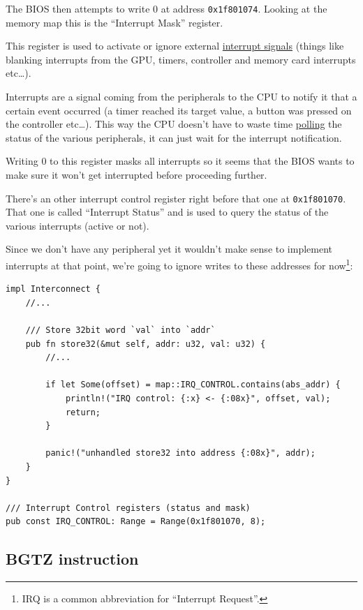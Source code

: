 \documentclass[a4paper]{article}
\newcommand{\code}[1] {\texttt{#1}}
\begin{document}
The BIOS then attempts to write 0 at address
\code{0x1f801074}. Looking at the memory map this is the ``Interrupt
Mask'' register.

This register is used to activate or ignore external
\href{https://en.wikipedia.org/wiki/Interrupt}{interrupt signals}
(things like blanking interrupts from the GPU, timers, controller and
memory card interrupts etc\dots{}).

Interrupts are a signal coming from the peripherals to the CPU to
notify it that a certain event occurred (a timer reached its target
value, a button was pressed on the controller etc\dots{}). This way
the CPU doesn't have to waste time
\href{https://en.wikipedia.org/wiki/Polling_%28computer_science%29}{polling}
  the status of the various peripherals, it can just wait for the
  interrupt notification.

Writing 0 to this register masks all interrupts so it seems that the
BIOS wants to make sure it won't get interrupted before proceeding
further.

There's an other interrupt control register right before that one at
\code{0x1f801070}. That one is called ``Interrupt Status'' and is used
to query the status of the various interrupts (active or not).

Since we don't have any peripheral yet it wouldn't make sense to
implement interrupts at that point, we're going to ignore writes to
these addresses for now\footnote{IRQ is a common abbreviation for
  ``Interrupt Request''.}:

\begin{lstlisting}
impl Interconnect {
    //...

    /// Store 32bit word `val` into `addr`
    pub fn store32(&mut self, addr: u32, val: u32) {
        //...

        if let Some(offset) = map::IRQ_CONTROL.contains(abs_addr) {
            println!("IRQ control: {:x} <- {:08x}", offset, val);
            return;
        }

        panic!("unhandled store32 into address {:08x}", addr);
    }
}

/// Interrupt Control registers (status and mask)
pub const IRQ_CONTROL: Range = Range(0x1f801070, 8);
\end{lstlisting}

\subsection{BGTZ instruction}
\end{document}
